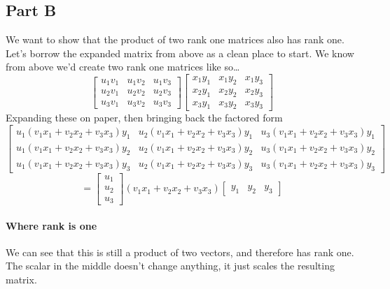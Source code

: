 \documentclass{article}
\begin{document}
        \subsection{Part B}
            We want to show that the product of two rank one matrices also has rank one.
            Let's borrow the expanded matrix from above as a clean place to start.
            We know from above we'd create two rank one matrices like so\dots
            \[
                \begin{bmatrix}u_1v_1&u_1v_2&u_1v_3\\u_2v_1&u_2v_2&u_2v_3\\u_3v_1&u_3v_2&u_3v_3\end{bmatrix}
                \begin{bmatrix}x_1y_1&x_1y_2&x_1y_3\\x_2y_1&x_2y_2&x_2y_3\\x_3y_1&x_3y_2&x_3y_3\end{bmatrix}
            \]
            Expanding these on paper, then bringing back the factored form
            {\small
            \[
                \begin{bmatrix}
                    u_1(v_1x_1+v_2x_2+v_3x_3)y_1 &
                    u_2(v_1x_1+v_2x_2+v_3x_3)y_1 &
                    u_3(v_1x_1+v_2x_2+v_3x_3)y_1 \\
                    u_1(v_1x_1+v_2x_2+v_3x_3)y_2 &
                    u_2(v_1x_1+v_2x_2+v_3x_3)y_2 &
                    u_3(v_1x_1+v_2x_2+v_3x_3)y_2 \\
                    u_1(v_1x_1+v_2x_2+v_3x_3)y_3 &
                    u_2(v_1x_1+v_2x_2+v_3x_3)y_3 &
                    u_3(v_1x_1+ v_2x_2+v_3x_3)y_3
                \end{bmatrix}
            \]
            }
            \[
                =
                \begin{bmatrix}
                    u_1\\u_2\\u_3
                \end{bmatrix}
                (v_1x_1+v_2x_2+v_3x_3)
                \begin{bmatrix}
                    y_1&y_2&y_3
                \end{bmatrix}
            \]
            \paragraph{Where rank is one}
                We can see that this is still a product of two vectors, and
                therefore has rank one.
                The scalar in the middle doesn't change anything, it just
                scales the resulting matrix.
\end{document}
